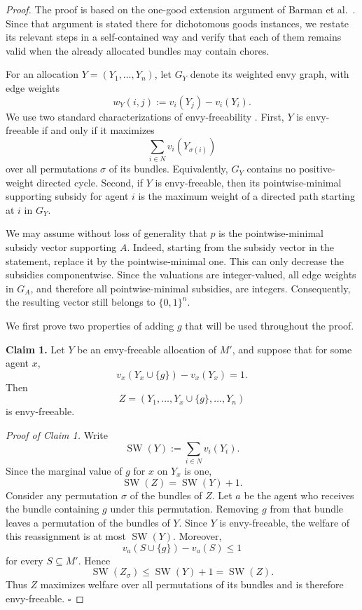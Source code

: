 \documentclass[sigconf,anonymous,nonacm]{aamas}
\begin{document}
\begin{proof}
The proof is based on the one-good extension argument of Barman et al.~\cite{BKNS22}. Since that argument is stated there for dichotomous goods instances, we restate its relevant steps in a self-contained way and verify that each of them remains valid when the already allocated bundles may contain chores.


For an allocation $Y=(Y_1,\ldots,Y_n)$, let $G_Y$ denote its weighted envy graph, with edge weights
\[
w_Y(i,j):=v_i(Y_j)-v_i(Y_i).
\]
We use two standard characterizations of envy-freeability
\cite{HS19,BKNS22}. First, $Y$ is envy-freeable if and only if it maximizes
\[
\sum_{i\in N}v_i(Y_{\sigma(i)})
\]
over all permutations $\sigma$ of its bundles. Equivalently, $G_Y$ contains no positive-weight directed cycle. Second, if $Y$ is envy-freeable, then its pointwise-minimal supporting subsidy for agent $i$ is the maximum weight of a directed path starting at $i$ in $G_Y$.

We may assume without loss of generality that $p$ is the pointwise-minimal subsidy vector supporting $A$. Indeed, starting from the subsidy vector in the statement, replace it by the pointwise-minimal one. This can only decrease the subsidies componentwise. Since the valuations are integer-valued, all edge weights in $G_A$, and therefore all pointwise-minimal subsidies, are integers. Consequently, the resulting vector still belongs to $\{0,1\}^n$.

We first prove two properties of adding $g$ that will be used throughout the proof.

\medskip
\noindent
\textbf{Claim 1.}
Let $Y$ be an envy-freeable allocation of $M'$, and suppose that for some agent $x$,
\[
v_x(Y_x\cup\{g\})-v_x(Y_x)=1.
\]
Then
\[
Z=(Y_1,\ldots,Y_x\cup\{g\},\ldots,Y_n)
\]
is envy-freeable.

\smallskip
\noindent
\emph{Proof of Claim 1.}
Write
\[
\operatorname{SW}(Y):=\sum_{i\in N}v_i(Y_i).
\]
Since the marginal value of $g$ for $x$ on $Y_x$ is one,
\[
\operatorname{SW}(Z)=\operatorname{SW}(Y)+1.
\]
Consider any permutation $\sigma$ of the bundles of $Z$. Let $a$ be the agent who receives the bundle containing $g$ under this permutation. Removing $g$ from that bundle leaves a permutation of the bundles of $Y$. Since $Y$ is envy-freeable, the welfare of this reassignment is at most
$\operatorname{SW}(Y)$. Moreover,
\[
v_a(S\cup\{g\})-v_a(S)\leq 1
\]
for every $S\subseteq M'$. Hence
\[
\operatorname{SW}(Z_\sigma)
\leq \operatorname{SW}(Y)+1
=\operatorname{SW}(Z).
\]
Thus $Z$ maximizes welfare over all permutations of its bundles and is therefore envy-freeable.
\hfill$\square$


\end{proof}
\end{document}

